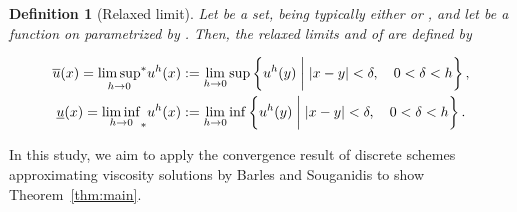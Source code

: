 \documentclass[11pt]{article}
\makeatletter
\numberwithin{equation}{section}
\newtheorem{defn}[theorem]{Definition}
\newcommand{\closure}[1]{\overline{#1}}
\newcounter{mathrecordid}
\newcommand{\mathboxbegin}[1]{%
  \stepcounter{mathrecordid}%
  \immediate\write\mathrecords{\themathrecordid,#1}%
  \special{pdf:bann << /Type /Annot /Subtype /Link /Border [0 0 0]
    /MathBoxID \themathrecordid /F 2
    /A << /S /URI /URI (urn:mathbox:\themathrecordid) >> >>}}
\newcommand{\mathboxinlineplain}[1]{$#1$}
\newcommand{\mathboxinline}[1]{%
  $\mathboxbegin{inline}%
  \special{pdf:literal direct /MathBoxBegin\themathrecordid\space MP}%
  #1\special{pdf:literal direct /MathBoxEnd\themathrecordid\space MP}%
  \special{pdf:eann}$}
\newcommand{\recordmath}{%
  \ifmeasuring@\expandafter\mathboxinlineplain
  \else\expandafter\mathboxinline\fi}
\makeatother
\begin{document}
\begin{defn}[Relaxed limit]
    \label{defn:relax-limit}
    Let \recordmath{\mathcal O} be a set, being typically either \recordmath{\closure{\Omega}} or \recordmath{\closure{\Omega}\times[0,T]},
    and let \recordmath{u^h} be a function on \recordmath{\mathcal O} parametrized by \recordmath{h>0}.
    Then, the relaxed limits \recordmath{\overline u} and \recordmath{\underline{u}} of \recordmath{u^h} are defined by

    \begin{equation*}
        \begin{aligned}
        \overline{u}(x) = {{\limsup_{h\to 0}}^*}u^h(x) &:= \lim_{h\to 0}\sup\left\{u^h(y)\biggm| |x-y| < \delta,\quad 0<\delta<h\right\},\\
        \underline{u}(x) = {{\liminf_{h\to 0}}_*}u^h(x) &:= \lim_{h\to 0}\inf\left\{u^h(y)\biggm| |x-y| < \delta,\quad 0<\delta<h\right\}.
        \end{aligned}
    \end{equation*}
\end{defn}

In this study, we aim to apply the convergence result of discrete schemes approximating viscosity solutions by Barles and Souganidis \cite[Theorem 2.1]{BS91} to show Theorem~\ref{thm:main}. 
\end{document}
